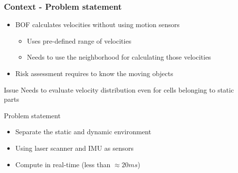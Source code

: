 \documentclass{beamer}
\begin{document}
	\begin{frame}
		\frametitle{Context - Problem statement}

		\begin{itemize}

		\item BOF calculates velocities without using motion sensors
			\begin{itemize}
			\item Uses pre-defined range of velocities
			\item Needs to use the neighborhood for calculating those velocities
			\end{itemize}

		\item Risk assessment requires to know the moving objects

		\end{itemize}

		 \begin{alertblock}{Issue}
		 Needs to evaluate velocity distribution even for cells belonging to static parts
		 \end{alertblock}

		
	
		\begin{block}{Problem statement}	
		
			\begin{itemize}		
			\item Separate the static and dynamic environment
			\item Using laser scanner and IMU as sensors
			\item Compute in real-time (less than $\approx 20ms$)
			\end{itemize}		
			
			
		\end{block}
		
	\end{frame}


		
%
%
%
\end{document}
